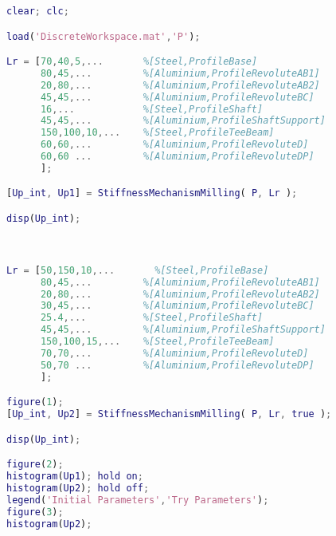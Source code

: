 \begin{lstlisting}[frame=single,language = matlab]
clear; clc;

load('DiscreteWorkspace.mat','P');

Lr = [70,40,5,...       %[Steel,ProfileBase]
      80,45,...         %[Aluminium,ProfileRevoluteAB1]
      20,80,...         %[Aluminium,ProfileRevoluteAB2]
      45,45,...         %[Aluminium,ProfileRevoluteBC]
      16,...            %[Steel,ProfileShaft]
      45,45,...         %[Aluminium,ProfileShaftSupport]
      150,100,10,...    %[Steel,ProfileTeeBeam]
      60,60,...         %[Aluminium,ProfileRevoluteD]
      60,60 ...         %[Aluminium,ProfileRevoluteDP]
      ];

[Up_int, Up1] = StiffnessMechanismMilling( P, Lr );

disp(Up_int);



Lr = [50,150,10,...       %[Steel,ProfileBase]
      80,45,...         %[Aluminium,ProfileRevoluteAB1]
      20,80,...         %[Aluminium,ProfileRevoluteAB2]
      30,45,...         %[Aluminium,ProfileRevoluteBC]
      25.4,...          %[Steel,ProfileShaft]
      45,45,...         %[Aluminium,ProfileShaftSupport]
      150,100,15,...    %[Steel,ProfileTeeBeam]
      70,70,...         %[Aluminium,ProfileRevoluteD]
      50,70 ...         %[Aluminium,ProfileRevoluteDP]
      ];

figure(1);
[Up_int, Up2] = StiffnessMechanismMilling( P, Lr, true );

disp(Up_int);

figure(2);
histogram(Up1); hold on;
histogram(Up2); hold off;
legend('Initial Parameters','Try Parameters');
figure(3);
histogram(Up2);
\end{lstlisting}

